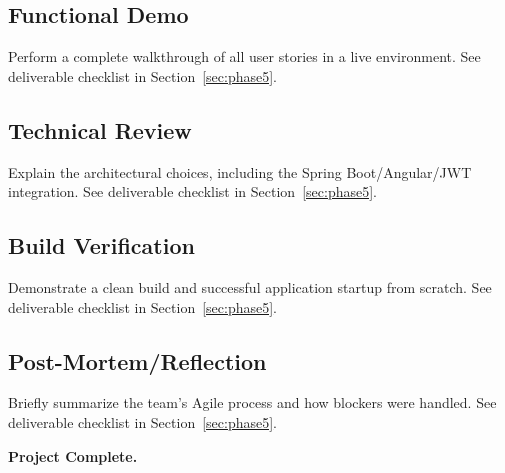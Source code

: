\newpage
\subsection{Functional Demo}\label{sec:functional-demo}
Perform a complete walkthrough of all user stories in a live environment.
See deliverable checklist in Section~\ref{sec:phase5}.

\newpage
\subsection{Technical Review}\label{sec:technical-review}
Explain the architectural choices, including the Spring Boot/Angular/JWT integration.
See deliverable checklist in Section~\ref{sec:phase5}.

\newpage
\subsection{Build Verification}\label{sec:build-verification}
Demonstrate a clean build and successful application startup from scratch.
See deliverable checklist in Section~\ref{sec:phase5}.

\newpage
\subsection{Post-Mortem/Reflection}\label{sec:post-mortem}
Briefly summarize the team's Agile process and how blockers were handled.
See deliverable checklist in Section~\ref{sec:phase5}.

\vspace{1em}
\noindent\textbf{Project Complete.}
